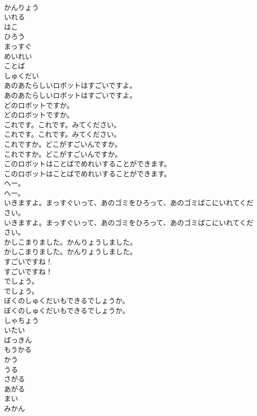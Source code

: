 \documentclass[8pt]{extreport}
\begin{document}
\begin{CJK}{UTF8}{min}
\\	かんりょう
\\	いれる
\\	はこ
\\	ひろう
\\	まっすぐ
\\	めいれい
\\	ことば
\\	しゅくだい
\\	あのあたらしいロボットはすごいですよ。	
\\	あのあたらしいロボットはすごいですよ。 
\\	どのロボットですか。	
\\	どのロボットですか。 
\\	これです。これです。みてください。	
\\	これです。これです。みてください。 
\\	これですか。どこがすごいんですか。	
\\	これですか。どこがすごいんですか。 
\\	このロボットはことばでめれいすることができます。	
\\	このロボットはことばでめれいすることができます。 
\\	へー。	
\\	へー。 
\\	いきますよ。まっすぐいって、あのゴミをひろって、あのゴミばこにいれてください。	
\\	いきますよ。まっすぐいって、あのゴミをひろって、あのゴミばこにいれてください。 
\\	かしこまりました。かんりょうしました。	
\\	かしこまりました。かんりょうしました。 
\\	すごいですね！	
\\	すごいですね！ 
\\	でしょう。	
\\	でしょう。 
\\	ぼくのしゅくだいもできるでしょうか。	
\\	ぼくのしゅくだいもできるでしょうか。 
\\	しゃちょう
\\	いたい
\\	ばっきん
\\	もうかる
\\	かう
\\	うる
\\	さがる
\\	あがる
\\	まい
\\	みかん

\end{CJK}
\end{document}
